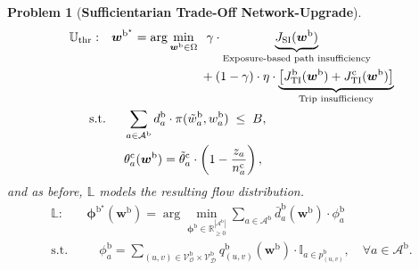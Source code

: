 \documentclass[lettersize,journal]{IEEEtran}
\newtheorem{problem}{\textbf{Problem}}
\begin{document}
\begin{problem}[\textbf{Sufficientarian Trade-Off Network-Upgrade}]  
\label{prob:sufficientarian}
\begin{align}
\mathbb{U}_{\text{thr}}: \quad  
& \boldsymbol{w}^{\mathrm{b}^\star} 
= \arg\min_{\boldsymbol{w}^\mathrm{b} \in \Omega} 
\;\; \gamma \cdot 
\underbrace{J_{\mathrm{SI}}(\boldsymbol{w}^\mathrm{b})}_{\text{Exposure-based path insufficiency}}
\nonumber \\
& \hspace{2.5cm} + (1-\gamma)\cdot \eta \cdot
\underbrace{ \left [J^\mathrm{b}_{\mathrm{TI}}(\boldsymbol{w}^\mathrm{b}) + J^\mathrm{c}_{\mathrm{TI}}(\boldsymbol{w}^\mathrm{b})\right ]}_{\text{Trip insufficiency}}
\label{eq:upper_suff} \\
\text{s.t. } &\quad 
\sum_{a \in \mathcal{A}^\mathrm{b}} d_a^\mathrm{b} \cdot \pi(\tilde{w}_a^\mathrm{b},w_a^\mathrm{b}) \;\leq\; B, \label{eq:budget_suff} \\
&\quad 
\theta_a^\mathrm{c}(\boldsymbol{w}^\mathrm{b}) =
\tilde{\theta}_a^\mathrm{c}  \cdot \left(1 - \frac{z_a}{n_a^\mathrm{c}}\right),
\end{align}
and as before, $\mathbb{L}$ models the resulting flow distribution.
\begin{align}
\mathbb{L}: \quad  
& \boldsymbol{\phi}^{\mathrm{b}^\star}(\boldsymbol{w}^\mathrm{b}) 
= \arg\min_{\boldsymbol{\phi}^\mathrm{b} \in \mathbb{R}_{\geq 0}^{|\mathcal{A}^\mathrm{b}|}}
\sum_{a \in \mathcal{A}^\mathrm{b}} \bar{d}_a^\mathrm{b}(\boldsymbol{w}^\mathrm{b}) \cdot \phi_a^\mathrm{b}
\label{eq:lower_suff} \\
\text{s.t. } &\quad 
\phi_a^\mathrm{b} = \sum_{(u,v) \in \mathcal{V}^\mathrm{b}_\mathcal{O} \times \mathcal{V}^\mathrm{b}_\mathcal{D}}
q_{(u,v)}^\mathrm{b}(\boldsymbol{w}^\mathrm{b})  \cdot \mathbb{I}_{a \in p_{(u,v)}^\mathrm{b}}, 
\quad \forall a \in \mathcal{A}^\mathrm{b}. \nonumber
\end{align}
\end{problem}
\end{document}
